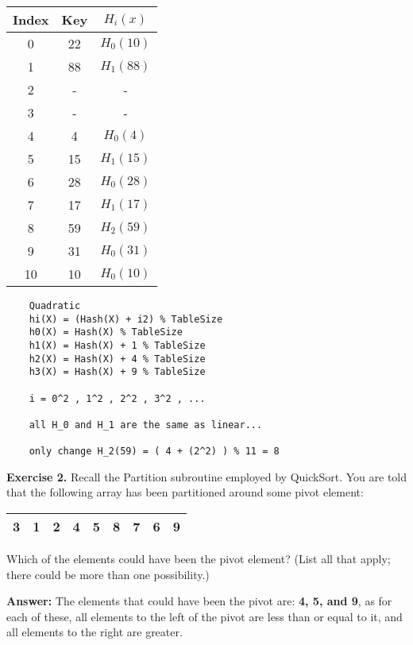 \documentclass[11pt]{article}
\begin{document}
\begin{center}
\begin{tabular}{|c c c |} 
 \hline
 Index & Key & $H_i(x)$ \\ 
 \hline\hline
 0 & 22 &  $H_0(10)$ \\ 
\hline
 1 & 88 & $H_1(88)$ \\ 
 \hline
 2 & - & -  \\ 
 \hline
 3 & - & -  \\ 
 \hline
 4 & 4 & $H_0(4)$  \\ 
 \hline
 5 & 15 & $H_1(15)$  \\
  \hline
6 & 28 & $H_0(28)$  \\ 
 \hline
 7 & 17 & $H_1(17)$  \\ 
 \hline
 8 & 59 & $H_2(59)$   \\ 
 \hline
 9 & 31 & $H_0(31)$  \\
  \hline
10 & 10 & $H_0(10)$  \\
  \hline
\end{tabular}
\end{center}
\begin{verbatim}
    Quadratic
    hi(X) = (Hash(X) + i2) % TableSize
    h0(X) = Hash(X) % TableSize
    h1(X) = Hash(X) + 1 % TableSize
    h2(X) = Hash(X) + 4 % TableSize
    h3(X) = Hash(X) + 9 % TableSize

    i = 0^2 , 1^2 , 2^2 , 3^2 , ... 

    all H_0 and H_1 are the same as linear...

    only change H_2(59) = ( 4 + (2^2) ) % 11 = 8 
\end{verbatim}
\bigskip




\textbf{Exercise 2.}  Recall the \textsf{Partition} subroutine employed by \textsf{QuickSort}. You are told that the following array has been partitioned around some pivot element:
\medskip

\begin{tabular}{|c|c|c|c|c|c|c|c|c|}
\hline 
3 & 1& 2 & 4 &5 &8 & 7 & 6 & 9 \\
\hline
\end{tabular}
\medskip

Which of the elements could have been the pivot element? (List all that apply; there could be more than one possibility.)
\medskip

\textbf{Answer:} The elements that could have been the pivot are: \textbf{4, 5, and 9}, as for each of these, all elements to the left of the pivot are less than or equal to it, and all elements to the right are greater.
\bigskip
\end{document}
